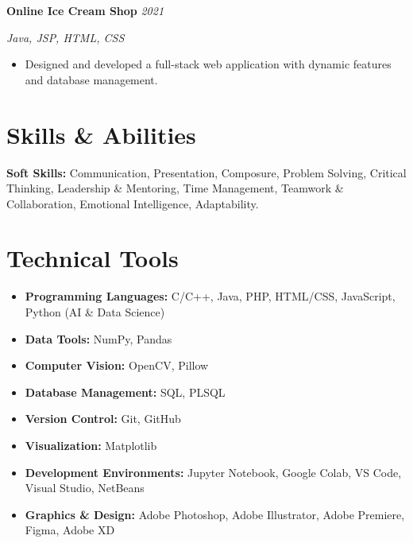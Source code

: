 \documentclass[a4paper,11pt]{article}
\newcommand{\cvproject}[2]{%
  \textbf{#1} \hfill \textit{#2}
  \vspace{2pt}
}
\begin{document}
\vspace{6pt}

\cvproject{Online Ice Cream Shop}{2021}
\textit{Java, JSP, HTML, CSS}
\begin{itemize}[leftmargin=1.5em, topsep=2pt, itemsep=1pt]
  \item Designed and developed a full-stack web application with dynamic features and database management.
\end{itemize}

\section{Skills \& Abilities}

\textbf{Soft Skills:} Communication, Presentation, Composure, Problem Solving, Critical Thinking, Leadership \& Mentoring, Time Management, Teamwork \& Collaboration, Emotional Intelligence, Adaptability.

\section{Technical Tools}

\begin{itemize}[leftmargin=1.5em, topsep=2pt, itemsep=2pt]
  \item \textbf{Programming Languages:} C/C++, Java, PHP, HTML/CSS, JavaScript, Python (AI \& Data Science)
  \item \textbf{Data Tools:} NumPy, Pandas
  \item \textbf{Computer Vision:} OpenCV, Pillow
  \item \textbf{Database Management:} SQL, PLSQL
  \item \textbf{Version Control:} Git, GitHub
  \item \textbf{Visualization:} Matplotlib
  \item \textbf{Development Environments:} Jupyter Notebook, Google Colab, VS Code, Visual Studio, NetBeans
  \item \textbf{Graphics \& Design:} Adobe Photoshop, Adobe Illustrator, Adobe Premiere, Figma, Adobe XD
\end{itemize}
\end{document}

